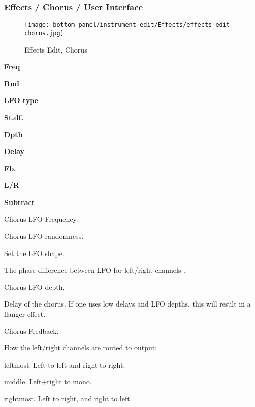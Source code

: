 \subsubsection{Effects / Chorus / User Interface}
\label{subsubsec:effects_edit_chorus_ui}

\begin{figure}[H]
   \centering 
   \texttt{[image: bottom-panel/instrument-edit/Effects/effects-edit-chorus.jpg]}
   \caption{Effects Edit, Chorus}
   \label{fig:effects_edit_chorus}
\end{figure}

   \begin{enumber}
      \item \textbf{Freq}
      \item \textbf{Rnd}
      \item \textbf{LFO type}
      \item \textbf{St.df.}
      \item \textbf{Dpth}
      \item \textbf{Delay}
      \item \textbf{Fb.}
      \item \textbf{L/R}
      \item \textbf{Subtract}
   \end{enumber}

   \setcounter{ItemCounter}{0}      %

   Chorus LFO Frequency.

   Chorus LFO randomness.

   Set the LFO shape.

   The phase difference between LFO for left/right channels .

   Chorus LFO depth.

   Delay of the chorus.
   If one uses low delays and LFO depths, this will result in a flanger
   effect.

   Chorus Feedback.

   How the left/right channels are routed to output:

      \begin{enumber}
         \item leftmost. Left to left and right to right.
         \item middle. Left+right to mono.
         \item rightmost. Left to right, and right to left.
      \end{enumber}


